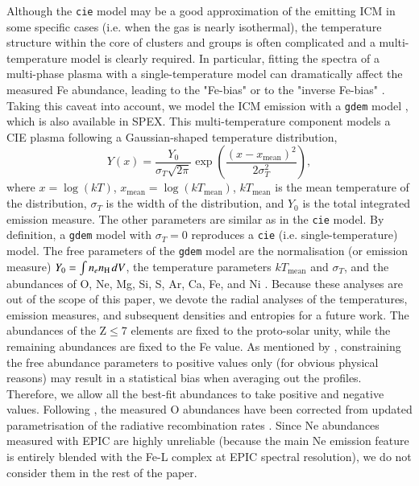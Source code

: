 \documentclass{aa}
\begin{document}
Although the \texttt{cie} model may be a good approximation of the emitting ICM in some specific cases (i.e. when the gas is nearly isothermal), the temperature structure within the core of clusters and groups is often complicated and a multi-temperature model is clearly required. In particular, fitting the spectra of a multi-phase plasma with a single-temperature model can dramatically affect the measured Fe abundance, leading to the "Fe-bias" \citep{1994ApJ...427...86B,1998MNRAS.296..977B,2000MNRAS.311..176B} or to the "inverse Fe-bias" \citep{2008ApJ...674..728R,2009A&A...493..409S,2010A&A...522A..34G}. Taking this caveat into account, we model the ICM emission with a \texttt{gdem} model \citep[e.g.][]{2006A&A...452..397D}, which is also available in SPEX. This multi-temperature component models a CIE plasma following a Gaussian-shaped temperature distribution,
\begin{equation} \label{eq:gdem}
Y(x) = \frac{Y_0}{\sigma_{T} \sqrt{2 \pi}} \exp \left( \frac{(x-x_\text{mean})^2}{2 \sigma^2_{T}} \right),
\end{equation} 
where $x=\log(kT)$, $x_\text{mean}=\log(kT_\text{mean})$, $kT_\text{mean}$ is the mean temperature of the distribution, $\sigma_T$ is the width of the distribution, and $Y_0$ is the total integrated emission measure. The other parameters are similar as in the \texttt{cie} model. By definition, a \texttt{gdem} model with $\sigma_T=0$ reproduces a \texttt{cie} (i.e. single-temperature) model.
The free parameters of the \texttt{gdem} model are the normalisation (or emission measure) $Y_0 = \int n_e n_\ion{H}{} dV$, the temperature parameters $kT_\text{mean}$ and $\sigma_T$, and the abundances of O, Ne, Mg, Si, S, Ar, Ca, Fe, and Ni \citep[given with respect to the proto-solar table of][see Sect. \ref{sect:intro}]{2009LanB...4B...44L}. Because these analyses are out of the scope of this paper, we devote the radial analyses of the temperatures, emission measures, and subsequent densities and entropies for a future work. The abundances of the Z$\le$7 elements are fixed to the proto-solar unity, while the remaining abundances are fixed to the Fe value. As mentioned by \citet{2008A&A...487..461L}, constraining the free abundance parameters to positive values only (for obvious physical reasons) may result in a statistical bias when averaging out the profiles. Therefore, we allow all the best-fit abundances to take positive and negative values. Following \citet{2016A&A...592A.157M}, the measured O abundances have been corrected from updated parametrisation of the radiative recombination rates \citep[see also][]{dePlaa2017}. Since Ne abundances measured with EPIC are highly unreliable (because the main Ne emission feature is entirely blended with the Fe-L complex at EPIC spectral resolution), we do not consider them in the rest of the paper.
\end{document}
